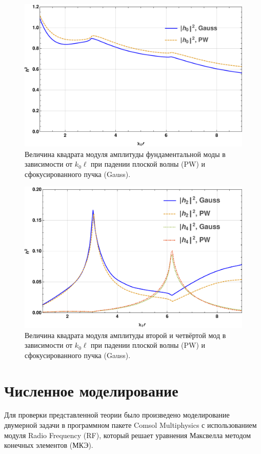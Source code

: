 \begin{figure}
    \centering
    \includegraphics[width=\textwidth]{figures/h0_PW_GAUSS.pdf}
    \caption{Величина квадрата модуля амплитуды фундаментальной моды в зависимости от $k_0 \ell$ при падении плоской волны (PW) и сфокусированного пучка (Gauss).}
    \label{fig:h0_pw_gauss}
\end{figure}
\begin{figure}
    \centering
    \includegraphics[width=\textwidth]{figures/h24_PW_GAUSS.pdf}
    \caption{Величина квадрата модуля амплитуды второй и четвёртой мод в зависимости от $k_0 \ell$ при падении плоской волны (PW) и сфокусированного пучка (Gauss).}
    \label{fig:h24_pw_gauss}
\end{figure}
\section{Численное моделирование}
Для проверки представленной теории было произведено моделирование двумерной задачи в программном пакете Comsol Multiphysics с использованием модуля Radio Frequency (RF), который решает уравнения Максвелла методом конечных элементов (МКЭ).

